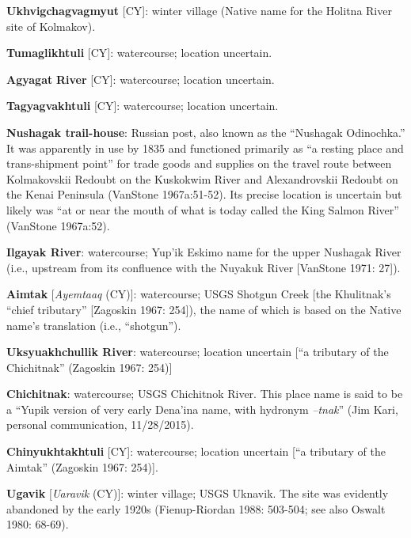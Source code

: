 \begin{hang}
\textbf{Ukhvigchagvagmyut} [CY]: winter village (Native name for the Holitna River site of Kolmakov).



\textbf{Tumaglikhtuli} [CY]: watercourse; location uncertain.



\textbf{Agyagat} \textbf{River} [CY]:\textbf{ }watercourse; location uncertain.



\textbf{Tagyagvakhtuli} [CY]: watercourse; location uncertain.



\textbf{Nushagak trail-house}: Russian post, also known as the “Nushagak Odinochka.” It was apparently in use by 1835 and functioned primarily as “a resting place and trans-shipment point” for trade goods and supplies on the travel route between Kolmakovskii Redoubt on the Kuskokwim River and Alexandrovskii Redoubt on the Kenai Peninsula (VanStone 1967a:51-52). Its precise location is uncertain but likely was “at or near the mouth of what is today called the King Salmon River” (VanStone 1967a:52).



\textbf{Ilgayak River}: watercourse; Yup’ik Eskimo name for the upper Nushagak River (i.e., upstream from its confluence with the Nuyakuk River [VanStone 1971: 27]).



\textbf{Aimtak} [\textit{Ayemtaaq} (CY)]: watercourse; USGS Shotgun Creek [the Khulitnak’s “chief tributary” [Zagoskin 1967: 254]), the name of which is based on the Native name’s translation (i.e., “shotgun”).



\textbf{Uksyuakhchullik River}: watercourse; location uncertain [“a tributary of the Chichitnak” (Zagoskin 1967: 254)]



\textbf{Chichitnak}: watercourse; USGS Chichitnok River. This place name is said to be a “Yupik version of very early Dena’ina name, with hydronym \textit{–tnak}” (Jim Kari, personal communication, 11/28/2015).



\textbf{Chinyukhtakhtuli} [CY]: watercourse; location uncertain [“a tributary of the Aimtak” (Zagoskin 1967: 254)].



\textbf{Ugavik} [\textit{Uaravik} (CY)]: winter village; USGS Uknavik. The site was evidently abandoned by the early 1920s (Fienup-Riordan 1988: 503-504; see also Oswalt 1980: 68-69).




\end{hang}
